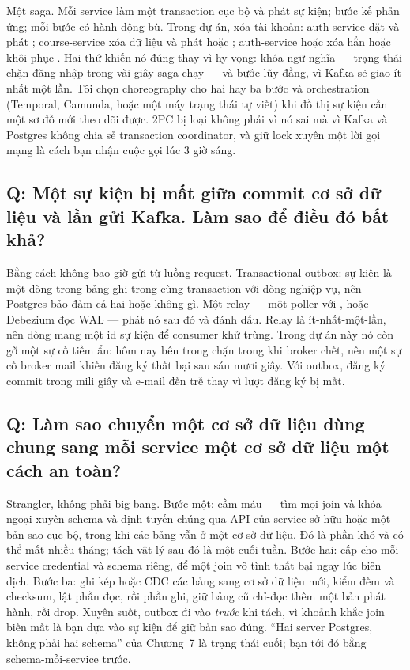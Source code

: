 Một saga. Mỗi service làm một transaction cục bộ và phát sự kiện; bước
kế phản ứng; mỗi bước có hành động bù. Trong dự án, xóa tài khoản:
auth-service đặt  và phát ;
course-service xóa dữ liệu và phát  hoặc
; auth-service hoặc xóa hẳn hoặc khôi phục
. Hai thứ khiến nó đúng thay vì hy vọng: khóa ngữ nghĩa
--- trạng thái  chặn đăng nhập trong vài giây saga chạy
--- và bước lũy đẳng, vì Kafka sẽ giao ít nhất một lần. Tôi chọn
choreography cho hai hay ba bước và orchestration (Temporal, Camunda,
hoặc một máy trạng thái tự viết) khi đồ thị sự kiện cần một sơ đồ mới
theo dõi được. 2PC bị loại không phải vì nó sai mà vì Kafka và Postgres
không chia sẻ transaction coordinator, và giữ lock xuyên một lời gọi
mạng là cách bạn nhận cuộc gọi lúc 3 giờ sáng.

\subsection*{Q: Một sự kiện bị mất giữa commit cơ sở dữ liệu và lần gửi Kafka. Làm sao để điều đó bất khả?}

Bằng cách không bao giờ gửi từ luồng request. Transactional outbox: sự
kiện là một dòng trong bảng  ghi trong cùng transaction với
dòng nghiệp vụ, nên Postgres bảo đảm cả hai hoặc không gì. Một relay
--- một poller  với , hoặc
Debezium đọc WAL --- phát nó sau đó và đánh dấu. Relay là
ít-nhất-một-lần, nên dòng mang một id sự kiện để consumer khử trùng.
Trong dự án này nó còn gỡ một sự cố tiềm ẩn: hôm nay
 bên trong  chặn
trong  khi broker chết, nên một sự cố broker mail
khiến đăng ký thất bại sau sáu mươi giây. Với outbox, đăng ký commit
trong mili giây và e-mail đến trễ thay vì lượt đăng ký bị mất.

\subsection*{Q: Làm sao chuyển một cơ sở dữ liệu dùng chung sang mỗi service một cơ sở dữ liệu một cách an toàn?}

Strangler, không phải big bang. Bước một: cầm máu --- tìm mọi join và
khóa ngoại xuyên schema và định tuyến chúng qua API của service sở hữu
hoặc một bản sao cục bộ, trong khi các bảng vẫn ở một cơ sở dữ liệu. Đó
là phần khó và có thể mất nhiều tháng; tách vật lý sau đó là một cuối
tuần. Bước hai: cấp cho mỗi service credential và schema riêng, để một
join vô tình thất bại ngay lúc biên dịch. Bước ba: ghi kép hoặc CDC các
bảng sang cơ sở dữ liệu mới, kiểm đếm và checksum, lật phần đọc, rồi
phần ghi, giữ bảng cũ chỉ-đọc thêm một bản phát hành, rồi drop. Xuyên
suốt, outbox đi vào \emph{trước} khi tách, vì khoảnh khắc join biến mất
là bạn dựa vào sự kiện để giữ bản sao đúng. ``Hai server Postgres,
không phải hai schema'' của Chương~7 là trạng thái cuối; bạn tới đó
bằng schema-mỗi-service trước.

